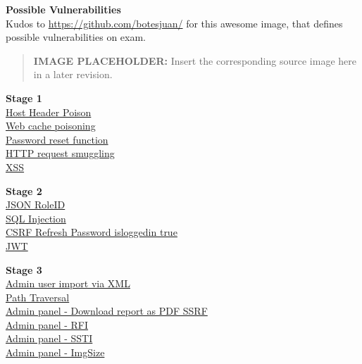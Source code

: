 \documentclass[
  letterpaper,
]{article}
\begin{document}
\textbf{Possible Vulnerabilities}\\
Kudos to \url{https://github.com/botesjuan/} for this awesome image,
that defines possible vulnerabilities on exam.\\
\begin{quote}
\textbf{IMAGE PLACEHOLDER:} Insert the corresponding source image here in a later revision.
\end{quote}
\textbf{Stage 1}\\
\href{https://github.com/DingyShark/BurpSuiteCertifiedPractitioner\#http-host-header-attacks}{Host
Header Poison}\\
\href{https://github.com/DingyShark/BurpSuiteCertifiedPractitioner\#web-cache-poisoning}{Web
cache poisoning}\\
\href{https://github.com/DingyShark/BurpSuiteCertifiedPractitioner\#3-password-reset-broken-logic}{Password
reset function}\\
\href{https://github.com/DingyShark/BurpSuiteCertifiedPractitioner\#http-request-smuggling}{HTTP
request smuggling}\\
\href{https://github.com/DingyShark/BurpSuiteCertifiedPractitioner\#xss}{XSS}

\textbf{Stage 2}\\
\href{https://github.com/DingyShark/BurpSuiteCertifiedPractitioner\#1-user-role-can-be-modified-in-user-profile}{JSON
RoleID}\\
\href{https://github.com/DingyShark/BurpSuiteCertifiedPractitioner\#sql-injection}{SQL
Injection}\\
\href{https://github.com/DingyShark/BurpSuiteCertifiedPractitioner\#10-csrf-refresh-password-isloggedin-true}{CSRF
Refresh Password isloggedin true}\\
\href{https://github.com/DingyShark/BurpSuiteCertifiedPractitioner\#jwt}{JWT}

\textbf{Stage 3}\\
\href{https://github.com/DingyShark/BurpSuiteCertifiedPractitioner\#6-admin-user-import-via-xml}{Admin
user import via XML}\\
\href{https://github.com/DingyShark/BurpSuiteCertifiedPractitioner\#directory-traversal}{Path
Traversal}\\
\href{https://github.com/DingyShark/BurpSuiteCertifiedPractitioner\#6-admin-panel---download-report-as-pdf-ssrf}{Admin
panel - Download report as PDF SSRF}\\
\href{https://github.com/DingyShark/BurpSuiteCertifiedPractitioner\#6-admin-panel-rfi}{Admin
panel - RFI}\\
\href{https://github.com/DingyShark/BurpSuiteCertifiedPractitioner\#6-admin-panel-password-reset-email-ssti}{Admin
panel - SSTI}\\
\href{https://github.com/DingyShark/BurpSuiteCertifiedPractitioner/\#5-admin-panel-imgsize-command-injection}{Admin
panel - ImgSize}
\end{document}
